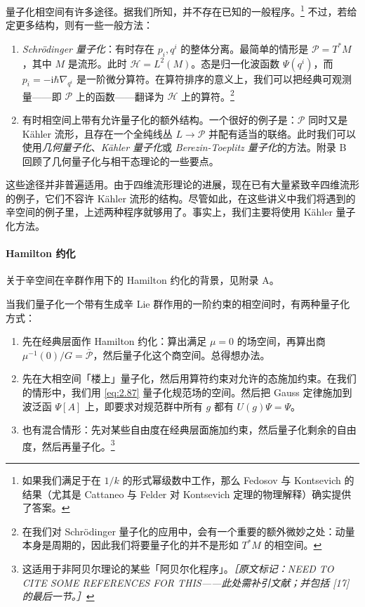量子化相空间有许多途径。据我们所知，并不存在已知的一般程序。\footnote{如果我们满足于在 $1/k$ 的形式幂级数中工作，那么 Fedosov 与 Kontsevich 的结果（尤其是 Cattaneo 与 Felder 对 Kontsevich 定理的物理解释）确实提供了答案。} 不过，若给定更多结构，则有一些一般方法：

\begin{enumerate}
  \item \emph{Schrödinger 量子化}：有时存在 $p_i,q^{i}$ 的整体分离。最简单的情形是 $\mathcal{P}=T^{*}M$，其中 $M$ 是流形。此时 $\mathcal{H}=L^{2}(M)$。态是归一化波函数 $\Psi(q^{i})$，而 $p_i=-\mathrm{i}\hbar\nabla_{q^{i}}$ 是一阶微分算符。在算符排序的意义上，我们可以把经典可观测量——即 $\mathcal{P}$ 上的函数——翻译为 $\mathcal{H}$ 上的算符。\footnote{在我们对 Schrödinger 量子化的应用中，会有一个重要的额外微妙之处：动量本身是周期的，因此我们将要量子化的并不是形如 $T^{*}M$ 的相空间。}

  \item 有时相空间上带有允许量子化的额外结构。一个很好的例子是：$\mathcal{P}$ 同时又是 Kähler 流形，且存在一个全纯线丛 $L\to\mathcal{P}$ 并配有适当的联络。此时我们可以使用\emph{几何量子化}、\emph{Kähler 量子化}或 \emph{Berezin-Toeplitz 量子化}的方法。附录 B 回顾了几何量子化与相干态理论的一些要点。
\end{enumerate}

这些途径并非普遍适用。由于四维流形理论的进展，现在已有大量紧致辛四维流形的例子，它们不容许 Kähler 流形的结构。尽管如此，在这些讲义中我们将遇到的辛空间的例子里，上述两种程序就够用了。事实上，我们主要将使用 Kähler 量子化方法。

\paragraph{Hamilton 约化} %

关于辛空间在辛群作用下的 Hamilton 约化的背景，见附录 A。

当我们量子化一个带有生成辛 Lie 群作用的一阶约束的相空间时，有两种量子化方式：

\begin{enumerate}
  \item 先在经典层面作 Hamilton 约化：算出满足 $\mu=0$ 的场空间，再算出商 $\mu^{-1}(0)/G=\bar{\mathcal{P}}$，然后量子化这个商空间。总得想办法。

  \item 先在大相空间「楼上」量子化，然后用算符约束对允许的态施加约束。在我们的情形中，我们用 \eqref{eq:2.87} 量子化规范场的空间。然后把 Gauss 定律施加到波泛函 $\Psi[A]$ 上，即要求对规范群中所有 $g$ 都有 $U(g)\Psi=\Psi$。

  \item 也有混合情形：先对某些自由度在经典层面施加约束，然后量子化剩余的自由度，然后再量子化。\footnote{这适用于非阿贝尔理论的某些「阿贝尔化程序」。{\small\itshape ［原文标记：NEED TO CITE SOME REFERENCES FOR THIS——此处需补引文献；并包括 [17] 的最后一节。］}}
\end{enumerate}

